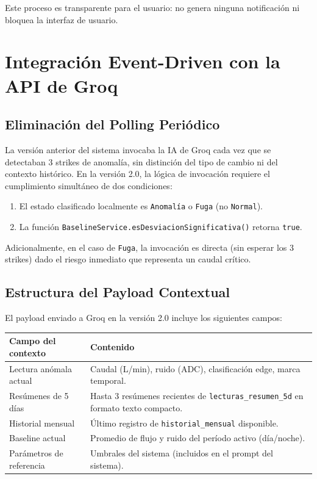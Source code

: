\documentclass[12pt,a4paper]{article}
\begin{document}
Este proceso es transparente para el usuario: no genera ninguna notificación ni bloquea la interfaz de usuario.

\section{Integración Event-Driven con la API de Groq}

\subsection{Eliminación del Polling Periódico}

La versión anterior del sistema invocaba la IA de Groq cada vez que se detectaban 3 strikes de anomalía, sin distinción del tipo de cambio ni del contexto histórico. En la versión 2.0, la lógica de invocación requiere el cumplimiento simultáneo de dos condiciones:

\begin{enumerate}[noitemsep]
    \item El estado clasificado localmente es \texttt{Anomalía} o \texttt{Fuga} (no \texttt{Normal}).
    \item La función \texttt{BaselineService.esDesviacionSignificativa()} retorna \texttt{true}.
\end{enumerate}

Adicionalmente, en el caso de \texttt{Fuga}, la invocación es directa (sin esperar los 3 strikes) dado el riesgo inmediato que representa un caudal crítico.

\subsection{Estructura del Payload Contextual}

El payload enviado a Groq en la versión 2.0 incluye los siguientes campos:

\begin{center}
\begin{tabularx}{0.9\textwidth}{lX}
    \toprule
    \textbf{Campo del contexto} & \textbf{Contenido} \\
    \midrule
    Lectura anómala actual & Caudal (L/min), ruido (ADC), clasificación edge, marca temporal. \\
    Resúmenes de 5 días    & Hasta 3 resúmenes recientes de \texttt{lecturas\_resumen\_5d} en formato texto compacto. \\
    Historial mensual      & Último registro de \texttt{historial\_mensual} disponible. \\
    Baseline actual        & Promedio de flujo y ruido del período activo (día/noche). \\
    Parámetros de referencia & Umbrales del sistema (incluidos en el prompt del sistema). \\
    \bottomrule
\end{tabularx}
\end{center}
\end{document}
